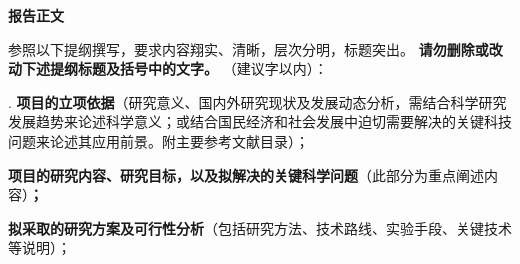 \documentclass[12pt,UTF8,AutoFakeBold=3,a4paper,fontset=windows]{ctexart}
\newcommand{\kaishunumeng}[1]{{\kaishueng #1}}
\newcommand{\sanhao}{\fontsize{16pt}{\baselineskip}\selectfont}
\newcommand{\sihao}{\fontsize{14pt}{\baselineskip}\selectfont}
\newcommand{\wuhao}{\fontsize{10.5pt}{\baselineskip}\selectfont}
\begin{document}


\begin{center}
{\sanhao \kaishu \bfseries 报告正文 }
\end{center}
\vskip -2mm

{\sihao \kaishu 参照以下提纲撰写，要求内容翔实、清晰，层次分明，标题突出。{\color{NsfcBlue} \bfseries 请勿删除或改动下述提纲标题及括号中的文字。}}
\vskip 2mm
{\color{NsfcBlue} \sihao {}（建议\kaishunumeng{8000}字以内）：}
\vskip 2mm



{\sihao \kaishu \color{NsfcBlue} \kaishunumeng{1.} {\bfseries 项目的立项依据}（研究意义、国内外研究现状及发展动态分析，需结合科学研究发展趋势来论述科学意义；或结合国民经济和社会发展中迫切需要解决的关键科技问题来论述其应用前景。附主要参考文献目录）；}

\vskip 2mm
{\noindent \sihao {}}
\vskip 2mm



\vskip 2mm
{\noindent \sihao {}}
\vskip 2mm



\begin{spacing}{1}
{\kaishu \wuhao
% 
% 



\vspace{12bp}
}
\end{spacing}



{\sihao \color{NsfcBlue} \kaishu  \kaishunumeng{2.} {\bfseries 项目的研究内容、研究目标，以及拟解决的关键科学问题}（此部分为重点阐述内容）{\bfseries ；}}

\vskip 2mm
{\noindent \sihao {}}
\vskip 2mm



\vskip 2mm
{\noindent \sihao {}}
\vskip 2mm



\vskip 2mm
{\noindent \sihao {}}
\vskip 2mm



{\sihao \color{NsfcBlue} \kaishu \kaishunumeng{3.} {\bfseries 拟采取的研究方案及可行性分析}（包括研究方法、技术路线、实验手段、关键技术等说明）；}

\vskip 2mm
{\noindent \sihao {}}
\vskip 2mm
\end{document}
